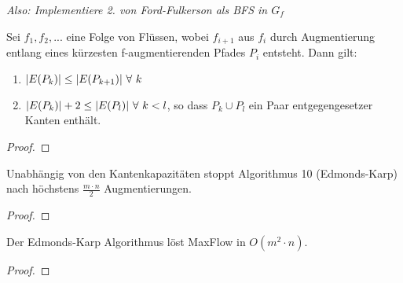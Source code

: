 \textit{Also: Implementiere 2. von Ford-Fulkerson als BFS in $G_f$}
\begin{lemma}
	Sei $f_1, f_2, ...$ eine Folge von Flüssen, wobei $f_{i+1}$ aus $f_i$ durch Augmentierung entlang eines kürzesten f-augmentierenden Pfades $P_i$ entsteht. Dann gilt:
	\begin{enumerate}[label=\alph*)]
		\item $\vert E(P_k) \vert \le \vert E(P_{k+1}) \vert ~\forall~k$
		\item $\vert E(P_k) \vert + 2 \le \vert E(P_l) \vert ~\forall~k<l$, so dass $P_k \cup P_l$ ein Paar entgegengesetzer Kanten enthält.
	\end{enumerate}
\end{lemma}
\begin{proof}
	
\end{proof}
\begin{satz}
	Unabhängig von den Kantenkapazitäten stoppt Algorithmus 10 (Edmonds-Karp) nach höchstens $\frac{m\cdot n}{2}$ Augmentierungen.
\end{satz}
\begin{proof}
	
\end{proof}
\begin{korollar}
	Der Edmonds-Karp Algorithmus löst MaxFlow in $O(m^2\cdot n)$.
\end{korollar}
\begin{proof}
	
\end{proof}
